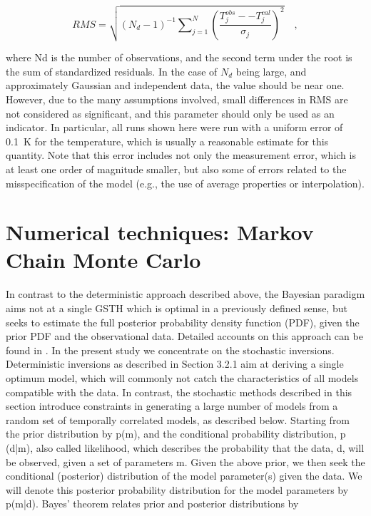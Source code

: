 \documentclass[cp]{copernicus}
\begin{document}
\begin{equation}\label{eqn:11}
RMS = \sqrt {\left( {{N_d} - 1} \right)_{}^{ - 1}\sum\nolimits_{j = 1}^N 
{{{\left( {\frac{{T_j^{obs}--T_j^{cal}}}{{{\sigma _j}}}} \right)}^2}} } \quad ,
\end{equation} 

where Nd is the number of observations, and the second term under the root is the sum of 
standardized residuals. In the case of $N_d$ being large, and approximately Gaussian and independent 
data, the value should be near one. However, due to the many assumptions involved, small differences 
in RMS are not considered as significant, and this parameter should only be used as an indicator. In 
particular, all runs shown here were run with a uniform error of 0.1~K for the temperature, which is 
usually a reasonable estimate for this quantity. Note that this error includes not only the 
measurement error, which is at least one order of magnitude smaller, but also some of errors 
related to the misspecification of the model (e.g., the use of average properties or interpolation).

\section{Numerical techniques: Markov Chain Monte Carlo}
In contrast to the deterministic approach described above, the Bayesian paradigm \cite[see, 
e.g.][]{Gelman2013a} aims not at a single GSTH which is optimal in a previously defined sense, but 
seeks to estimate the full posterior probability density function (PDF), given the prior PDF and the 
observational data. Detailed accounts on this approach can be found in 
\citep{Mosegaard1995a,Mosegaard2002a,Tarantola2005a}. In the present study we concentrate on the 
stochastic inversions. Deterministic inversions as described in Section 3.2.1 aim at deriving a 
single optimum model, which will commonly not catch the characteristics of all models compatible 
with the data. In contrast, the stochastic methods described in this section introduce constraints 
in generating a large number of models from a random set of temporally correlated models, as 
described below. Starting from the prior distribution by p(m), and the conditional probability 
distribution, p (d|m), also called likelihood, which describes the probability that the data, d, 
will be observed, given a set of parameters m. Given the above prior, we then seek the conditional 
(posterior) distribution of the model parameter(s) given the data. We will denote this posterior 
probability distribution for the model parameters by p(m|d). Bayes’ theorem relates prior and 
posterior distributions by
 
\end{document}
